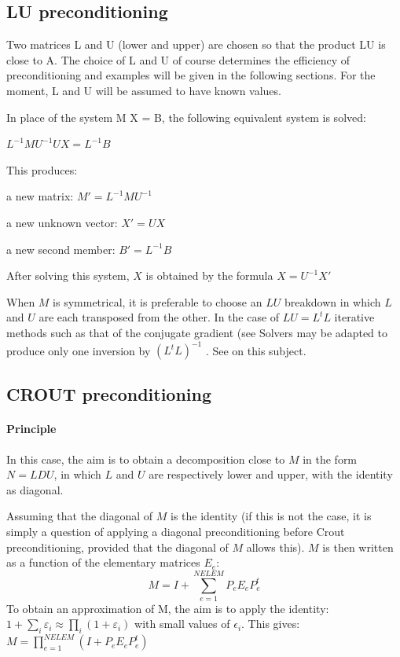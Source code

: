 \subsection{LU preconditioning}

Two matrices L and U (lower and upper) are chosen so that the product LU is
close to A. The choice of L and U of course determines the efficiency of
preconditioning and examples will be given in the following sections. For the
moment, L and U will be assumed to have known values.

In place of the system M X = B, the following equivalent system is solved:

$L^{-1} M U^{-1} U X  =  L^{-1} B$



This produces:



a new matrix: $M' = L^{-1} M U^{-1}$

a new unknown vector: $X' = U X$

a new second member: $B' = L^{-1} B$



After solving this system, $X$ is obtained by the formula $X = U^{-1} X'$

When $M$ is symmetrical, it is preferable to choose an $LU$ breakdown in which
$L$ and $U$ are each transposed from the other. In the case of $LU = L^{t}L$
iterative methods such as that of the conjugate gradient (see
Solvers may be adapted to produce only one inversion by
$(L^{t}L)^{-1}$ . See \citet{Hervouet1991} on this subject.

\subsection{CROUT preconditioning}

\paragraph{Principle}

In this case, the aim is to obtain a decomposition close to $M$ in the form $N
= LDU$, in which $L$ and $U$ are respectively lower and upper, with the
identity as diagonal.

Assuming that the diagonal of $M$ is the identity (if this is not the case, it is
simply a question of applying a diagonal preconditioning before Crout
preconditioning, provided that the diagonal of $M$ allows this). $M$ is then
written as a function of the elementary matrices $E_{e}$:
\[M=I+\sum _{e=1}^{NELEM}P_{e} E_{e} P_{e}^{t}  \]
To obtain an approximation of M, the aim is to apply the identity:
$1+\sum _{i}\varepsilon _{i}  \approx \prod _{i}(1+\varepsilon _{i} ) $ with
small values of $\epsilon _{i}$. This gives: $M=\prod _{e=1}^{NELEM}(I+P_{e} E_{e} P_{e}^{t}
) $


